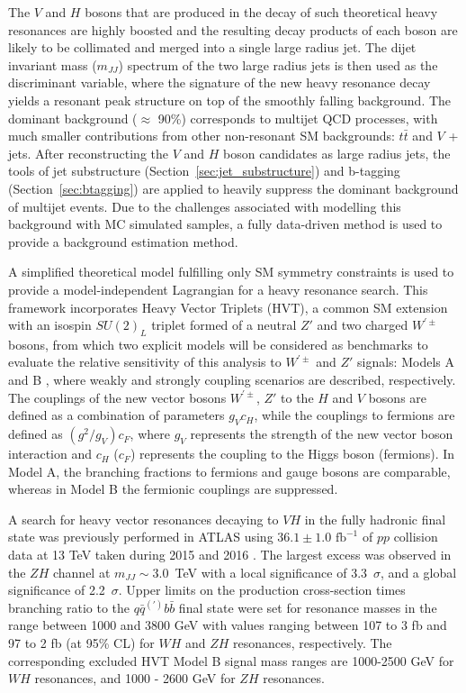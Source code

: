 The $V$ and $H$ bosons that are produced in the decay of such theoretical heavy resonances are highly boosted and the resulting decay products of each boson are likely to be collimated and merged into a single large radius jet.
The dijet invariant mass ($m_{JJ}$) spectrum of the two large radius jets is then used as the discriminant variable, where the signature of the new heavy resonance decay yields a resonant peak structure on top of the smoothly falling background.
The dominant background ($\approx$ 90\%) corresponds to multijet QCD processes, with much smaller contributions from other non-resonant SM backgrounds: $t\bar{t}$ and $V$ + jets.
After reconstructing the $V$ and $H$ boson candidates as large radius jets, the tools of jet substructure (Section~\ref{sec:jet_substructure}) and b-tagging (Section~\ref{sec:btagging}) are applied to heavily suppress the dominant background of multijet events.
Due to the challenges associated with modelling this background with MC simulated samples, a fully data-driven method is used to provide a background estimation method.

A simplified theoretical model \cite{Pappadopulo:2014qza} fulfilling only SM symmetry constraints is used to provide a model-independent Lagrangian for a heavy resonance search.
This framework incorporates Heavy Vector Triplets (HVT), a common SM extension with an isospin $SU(2)_{L}$ triplet formed of a neutral $Z'$ and two charged $W^{\prime \pm}$ bosons, from which two explicit models will be considered as benchmarks to evaluate the relative sensitivity of this analysis to $W^{\prime \pm}$ and $Z'$ signals: Models A and B \cite{Pappadopulo:2014qza}, where weakly and strongly coupling scenarios are described, respectively.
The couplings of the new vector bosons $W^{\prime \pm}$, $Z'$ to the $H$ and $V$ bosons are defined as a combination of parameters $g_{V}c_{H}$, while the couplings to fermions are defined as $(g^{2}/g_{V})c_{F}$, where $g_V$ represents the strength of the new vector boson interaction and $c_{H}$ ($c_{F}$) represents the coupling to the Higgs boson (fermions).
In Model A, the branching fractions to fermions and gauge bosons are comparable, whereas in Model B the fermionic couplings are suppressed.

A search for heavy vector resonances decaying to $VH$ in the fully hadronic final state was previously performed in ATLAS using $36.1\pm1.0\text{~fb}^{-1}$ of $pp$ collision data at 13 TeV taken during 2015 and 2016 \cite{Aaboud:2017ahz}.
The largest excess was observed in the $ZH$ channel at $m_{JJ}\sim3.0$~TeV with a local significance of 3.3~$\sigma$, and a  global significance of  2.2~$\sigma$.
Upper limits on the production cross-section times branching ratio to the $q\bar{q}^{(\prime)}b\bar{b}$ final state were set for resonance masses in the range between 1000 and 3800 GeV with values ranging between 107 to 3 fb and 97 to 2 fb (at 95\% CL) for $WH$ and $ZH$ resonances, respectively.
The corresponding excluded HVT Model B signal mass ranges are 1000-2500 GeV for $WH$ resonances, and 1000 - 2600 GeV for $ZH$ resonances.

